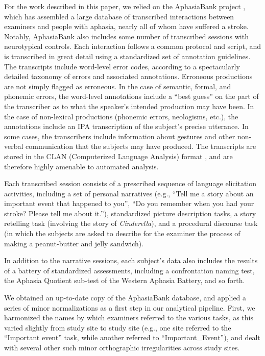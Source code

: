 \documentclass[11pt,letterpaper]{article}
\begin{document}
For the work described in this paper, we relied on the AphasiaBank project \cite{MacWhinney:2011er}, which has assembled a large database of transcribed interactions between examiners and people with aphasia, nearly all of whom have suffered a stroke.
Notably, AphasiaBank also includes some number of transcribed sessions with neurotypical controls.
Each interaction follows a common protocol and script, and is transcribed in great detail using a standardized set of annotation guidelines.
The transcripts include word-level error codes, according to a spectacularly detailed taxonomy of errors and associated annotations.
Erroneous productions are not simply flagged as erroneous.
In the case of semantic, formal, and phonemic errors, the word-level annotations include a ``best guess'' on the part of the transcriber as to what the speaker's intended production may have been.
In the case of non-lexical productions (phonemic errors, neologisms, etc.), the annotations include an IPA transcription of the subject's precise utterance.
In some cases, the transcribers include information about gestures and other non-verbal communication that the subjects may have produced.
The transcripts are stored in the CLAN (Computerized Language Analysis) format \cite{MacWhinney:2000aa}, and are therefore highly amenable to automated analysis.

Each transcribed session consists of a prescribed sequence of language elicitation activities, including a set of personal narratives (e.g., ``Tell me a story about an important event that happened to you'', ``Do you remember when you had your stroke? Please tell me about it.''), standardized picture description tasks, a story retelling task (involving the story of \emph{Cinderella}), and a procedural discourse task (in which the subjects are asked to describe for the examiner the process of making a peanut-butter and jelly sandwich).

In addition to the narrative sessions, each subject's data also includes the results of a battery of standardized assessments, including a confrontation naming test, the Aphasia Quotient sub-test of the Western Aphasia Battery, and so forth.

We obtained an up-to-date copy of the AphasiaBank database, and applied a series of minor normalizations as a first step in our analytical pipeline. First, we harmonized the names by which examiners referred to the various tasks, as this varied slightly from study site to study site (e.g., one site referred to the ``Important event'' task, while another referred to ``Important\_Event''), and dealt with several other such minor orthographic irregularities across study sites.
\end{document}
